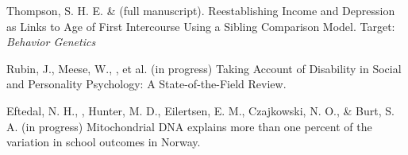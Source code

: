 
\item Thompson, S. H. E. \noteA \& \meb (full manuscript). Reestablishing Income and Depression as Links to Age of First Intercourse Using a Sibling Comparison Model. Target: \textit{Behavior Genetics}

\item Rubin, J., Meese, W., \meb, et al. (in progress) Taking Account of Disability in Social and Personality Psychology: A State-of-the-Field Review.

\item Eftedal, N. H., \meb, Hunter, M. D., Eilertsen, E. M., Czajkowski, N. O., \& Burt, S. A. (in progress) Mitochondrial DNA explains more than one percent of the variation in school outcomes in Norway. 




%
%










